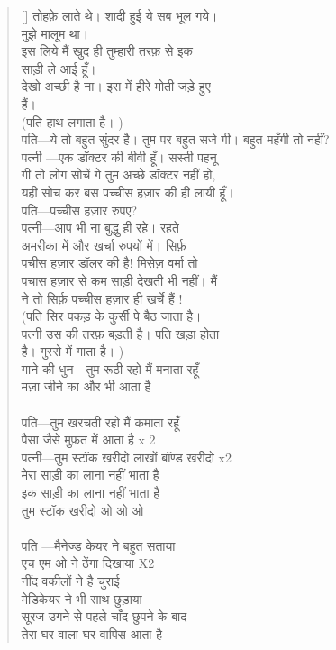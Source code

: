\begin{verse}[\versewidth]
{तोहफ़े लाते थे। शादी हुई ये सब भूल गये।\\
मुझे मालूम था।\\
इस लिये मैं खुद ही तुम्हारी तरफ़ से इक\\
साड़ी ले आई हूँ।\\
देखो अच्छी है ना। इस में हीरे मोती जड़े हुए\\
हैं।\\
(पति हाथ लगाता है।
)\\
पति—ये तो बहुत सुंदर है। तुम पर बहुत सजे गी। बहुत महँगी तो नहीं?\\
पत्नी —एक डॉक्टर की बीवी हूँ। सस्ती पहनू \\
गी तो लोग सोचें गे तुम अच्छे डॉक्टर नहीं हो,\\
यही सोच कर बस पच्चीस हज़ार की ही लायी हूँ।\\
पति—पच्चीस हज़ार रुपए?\\
पत्नी—आप भी ना बुद्धु ही रहे। रहते \\
अमरीका में और खर्चा रुपयों में। सिर्फ़ \\
पचीस हज़ार डॉलर की है! मिसेज़ वर्मा तो \\
पचास हज़ार से कम साड़ी देखती भी नहीं। मैं \\
ने तो सिर्फ़ पच्चीस हज़ार ही खर्चे हैं !\\
(पति सिर पकड़ के कुर्सी पे बैठ जाता है।\\
पत्नी उस की तरफ़ बड़ती है। पति खड़ा होता\\
है। गुस्से में गाता है।
) \\
गाने की धुन—तुम रूठी रहो मैं मनाता रहूँ\\
मज़ा जीने का और भी आता है\\
\\
पति—तुम खरचती रहो मैं कमाता रहूँ\\
पैसा जैसे मुफ़त में आता है x 2\\
पत्नी—तुम स्टॉक खरीदो लाखों बॉण्ड खरीदो x2 \\
मेरा साड़ी का लाना नहीं भाता है\\
इक साड़ी का लाना नहीं भाता है\\
तुम स्टॉक खरीदो ओ ओ ओ\\
\\
पति —मैनेज्ड केयर ने बहुत सताया\\
एच एम ओ ने ठेंगा दिखाया X2\\
नींद वकीलों ने है चुराई\\
मेडिकेयर ने भी साथ छुड़ाया\\
सूरज उगने से पहले चाँद छुपने के बाद\\
तेरा घर वाला घर वापिस आता है\\
}
\end{verse}
